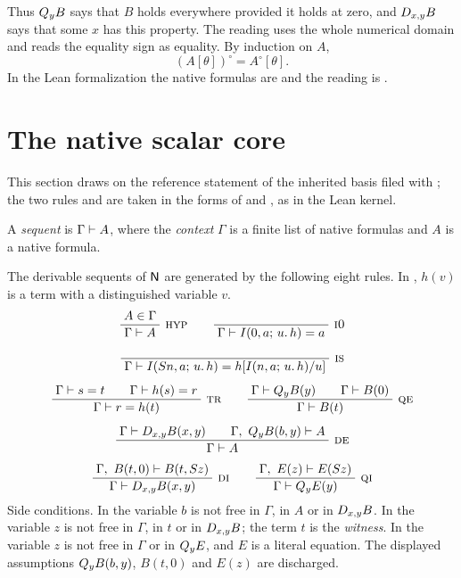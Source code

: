 Thus $Q_{y}B$ says that $B$ holds everywhere provided it holds at zero, and
$D_{x,y}B$ says that some $x$ has this property.  The reading uses the whole
numerical domain and reads the equality sign as equality.  By induction on
$A$,
\begin{equation}
 (A[\theta])^\circ = A^\circ[\theta]. \label{base:eq:reading-subst}
\end{equation}
In the Lean formalization the native formulas are  and the reading
is .

\section{The native scalar core}
\label{base:sec:kernel}

This section draws on the reference statement of the inherited basis filed
with ; the two rules  and 
are taken in the forms of  and , as in
the Lean kernel.

A \emph{sequent} is $\Gamma\vdash A$, where the \emph{context} $\Gamma$ is a
finite list of native formulas and $A$ is a native formula.

\begin{definition}
\label{base:def:kernel}
The derivable sequents of $\mathsf{N}$ are generated by the following eight rules.
In , $h(v)$ is a term with a distinguished variable $v$.
\begin{gather*}
 \infrule{A\in\Gamma}{\Gamma\proves A}\ \rulename{Hyp}
 \qquad
 \infrule{}{\Gamma\proves\It{0}{a}{u}{h}=a}\ \rulename{I0}
 \\[1.2ex]
 \infrule{}{\Gamma\proves\It{\Suc n}{a}{u}{h}=h\subst{\It{n}{a}{u}{h}}{u}}\
 \rulename{IS}
 \\[1.2ex]
 \infrule{\Gamma\proves s=t\qquad\Gamma\proves h(s)=r}
         {\Gamma\proves r=h(t)}\ \rulename{Tr}
 \qquad
 \infrule{\Gamma\proves\Q{y}B(y)\qquad\Gamma\proves B(0)}
         {\Gamma\proves B(t)}\ \rulename{QE}
 \\[1.2ex]
 \infrule{\Gamma\proves\D{x}{y}B(x,y)\qquad
          \Gamma,\ \Q{y}B(b,y)\proves A}
         {\Gamma\proves A}\ \rulename{DE}
 \\[1.2ex]
 \infrule{\Gamma,\ B(t,0)\proves B(t,\Suc z)}
         {\Gamma\proves\D{x}{y}B(x,y)}\ \rulename{DI}
 \qquad
 \infrule{\Gamma,\ E(z)\proves E(\Suc z)}
         {\Gamma\proves\Q{y}E(y)}\ \rulename{QI}
\end{gather*}
Side conditions.  In  the variable $b$ is not free in $\Gamma$,
in $A$ or in $D_{x,y}B$.  In \rulename{DI} the variable $z$ is not free in
$\Gamma$, in $t$ or in $D_{x,y}B$; the term $t$ is the \emph{witness}.  In
\rulename{QI} the variable $z$ is not free in $\Gamma$ or in $Q_{y}E$, and
$E$ is a literal equation.  The displayed assumptions $Q_{y}B(b,y)$,
$B(t,0)$ and $E(z)$ are discharged.
\end{definition}

